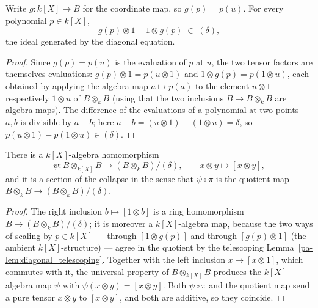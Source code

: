 \begin{lemma}
  \label{pa-lem:diagonal_telescoping}
  \leanok

  Write \(g \colon k[X] \to B\) for the coordinate map, so \(g(p) = p(u)\). For every polynomial
  \(p \in k[X]\),
  \[
    g(p) \otimes 1 - 1 \otimes g(p) \;\in\; (\delta),
  \]
  the ideal generated by the diagonal equation.
\end{lemma}
\begin{proof}
  \leanok
  Since \(g(p) = p(u)\) is the evaluation of \(p\) at \(u\), the two tensor factors are
  themselves evaluations: \(g(p) \otimes 1 = p(u \otimes 1)\) and \(1 \otimes g(p) = p(1 \otimes
  u)\), each obtained by applying the algebra map \(a \mapsto p(a)\) to the element \(u \otimes 1\)
  respectively \(1 \otimes u\) of \(B \otimes_k B\) (using that the two inclusions \(B \to B
  \otimes_k B\) are algebra maps). The difference of the evaluations of a polynomial at two
  points \(a, b\) is divisible by \(a - b\); here \(a - b = (u \otimes 1) - (1 \otimes u) =
  \delta\), so \(p(u \otimes 1) - p(1 \otimes u) \in (\delta)\).
\end{proof}

\begin{lemma}
  \label{pa-lem:diagonal_section}
  \leanok

  There is a \(k[X]\)-algebra homomorphism
  \[
    \psi \colon B \otimes_{k[X]} B \longrightarrow (B \otimes_k B)/(\delta), \qquad x \otimes y
    \mapsto [x \otimes y],
  \]
  and it is a section of the collapse in the sense that \(\psi \circ \pi\) is the quotient map
  \(B \otimes_k B \to (B \otimes_k B)/(\delta)\).
\end{lemma}
\begin{proof}
  \leanok
  The right inclusion \(b \mapsto [1 \otimes b]\) is a ring homomorphism \(B \to (B \otimes_k
  B)/(\delta)\); it is moreover a \(k[X]\)-algebra map, because the two ways of scaling by \(p \in
  k[X]\) — through \([1 \otimes g(p)]\) and through \([g(p) \otimes 1]\) (the ambient
  \(k[X]\)-structure) — agree in the quotient by the telescoping
  Lemma~\ref{pa-lem:diagonal_telescoping}. Together with the left inclusion \(x \mapsto [x \otimes
  1]\), which commutes with it, the universal property of \(B \otimes_{k[X]} B\) produces the
  \(k[X]\)-algebra map \(\psi\) with \(\psi(x \otimes y) = [x \otimes y]\). Both \(\psi \circ \pi\)
  and the quotient map send a pure tensor \(x \otimes y\) to \([x \otimes y]\), and both are
  additive, so they coincide.
\end{proof}

